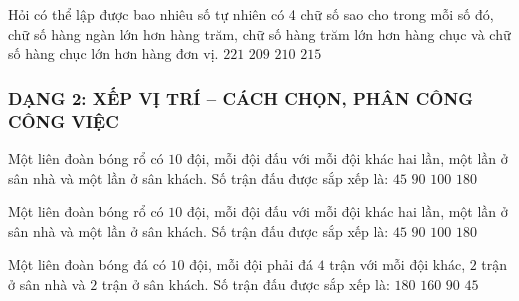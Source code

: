 \begin{ex}
	Hỏi có thể lập được bao nhiêu số tự nhiên có 4 chữ số sao cho trong mỗi số đó, chữ số hàng ngàn lớn hơn hàng trăm, chữ số hàng trăm lớn hơn hàng chục và chữ số hàng chục lớn hơn hàng đơn vị.
	\choice
	{$221$}
	{$209$}
	{\True $210$}
	{$215$}
\end{ex}

\subsubsection*{DẠNG 2: XẾP VỊ TRÍ -- CÁCH CHỌN, PHÂN CÔNG CÔNG VIỆC}

\begin{ex}
	Một liên đoàn bóng rổ có $10$ đội, mỗi đội đấu với mỗi đội khác hai lần, một lần ở sân nhà và một lần ở sân khách. Số trận đấu được sắp xếp là:
	\choice
	{$45$}
	{\True $90$}
	{$100$}
	{$180$}
\end{ex}

\begin{ex}
	Một liên đoàn bóng rổ có $10$ đội, mỗi đội đấu với mỗi đội khác hai lần, một lần ở sân nhà và một lần ở sân khách. Số trận đấu được sắp xếp là:
	\choice
	{$45$}
	{\True $90$}
	{$100$}
	{$180$}
\end{ex}

\begin{ex}
	Một liên đoàn bóng đá có $10$ đội, mỗi đội phải đá $4$ trận với mỗi đội khác, $2$ trận ở sân nhà và $2$ trận ở sân khách. Số trận đấu được sắp xếp là:
	\choice
	{\True $180$}
	{$160$}
	{$90$}
	{$45$}
\end{ex}

